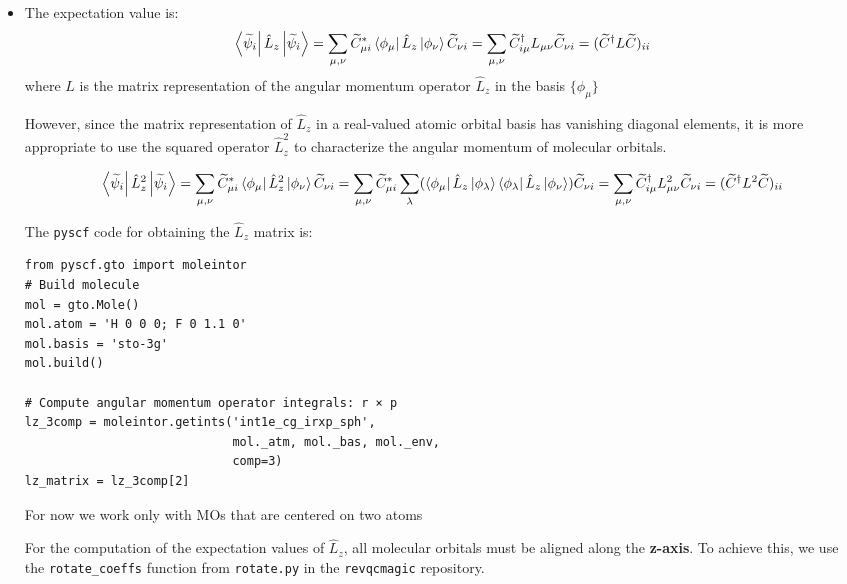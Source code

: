 \documentclass{article}
\begin{document}
\begin{itemize}
    \item The expectation value is:
    \[
    \bra{\widetilde{\psi}_i} {\hat{L}_z}\ket{\widetilde{\psi}_i} = \sum_{\mu,\nu} \widetilde{C}_{\mu i}^{*} \bra{\phi_\mu} \hat{L}_z \ket{\phi_\nu} \widetilde{C}_{\nu i} = \sum_{\mu,\nu} \widetilde{C}_{i \mu}^{\dagger} L_{\mu \nu} \widetilde{C}_{\nu i} = (\widetilde{C}^{\dagger} L \widetilde{C})_{ii}
    \]
    where \( L \) is the matrix representation of the angular momentum operator \(\hat{L}_z\) in the basis \( \{ \phi_\mu \} \) 

    However, since the matrix representation of $\hat{L}_z$ in a real-valued atomic orbital basis has vanishing diagonal elements, it is more appropriate to use the squared operator $\hat{L}_z^2$ to characterize the angular momentum of molecular orbitals.

    \[
    \bra{\widetilde{\psi}_i} {\hat{L}_z^{2}}\ket{\widetilde{\psi}_i} = \sum_{\mu,\nu} \widetilde{C}_{\mu i}^{*} \bra{\phi_\mu} \hat{L}_z^{2} \ket{\phi_\nu} \widetilde{C}_{\nu i} = \sum_{\mu,\nu} \widetilde{C}_{\mu i}^{*} \sum_{\lambda}( \bra{\phi_\mu} \hat{L}_z \ket{\phi_\lambda} \bra{\phi_\lambda} \hat{L}_z\ket{\phi_\nu}) \widetilde{C}_{\nu i} = \sum_{\mu,\nu} \widetilde{C}_{i \mu}^{\dagger} L_{\mu \nu}^2 \widetilde{C}_{\nu i} = (\widetilde{C}^{\dagger} L^2 \widetilde{C})_{ii}
    \]

    The \verb|pyscf| code for obtaining the $\hat{L}_z$ matrix is:

\begin{verbatim}
from pyscf.gto import moleintor
# Build molecule
mol = gto.Mole()
mol.atom = 'H 0 0 0; F 0 1.1 0'  
mol.basis = 'sto-3g'            
mol.build()

# Compute angular momentum operator integrals: r × p
lz_3comp = moleintor.getints('int1e_cg_irxp_sph',
                             mol._atm, mol._bas, mol._env,
                             comp=3)
lz_matrix = lz_3comp[2]

\end{verbatim}
\begin{tcolorbox}[colback=blue!5!white, colframe=red!75!black, title=Important Note]
For now we work only with MOs that are centered on two atoms
\end{tcolorbox}

For the computation of the expectation values of $\hat{L}_z$, all molecular orbitals must be aligned along the \textbf{z-axis}. To achieve this, we use the \verb|rotate_coeffs| function from \verb|rotate.py| in the \verb|revqcmagic| repository.


\end{itemize}
\end{document}
